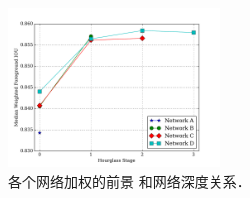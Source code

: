 \renewcommand{\captiontitle}{各个网络加权的前景 \IoU{} 和网络深度关系}
\begin{figure}
\begin{center}
\includegraphics[width=0.5\textwidth]{./data/trendline.pdf}
\caption[\captiontitle]{\captiontitle{}．}
\label{fig:hourglass-accuracy}
\end{center}
\end{figure}
